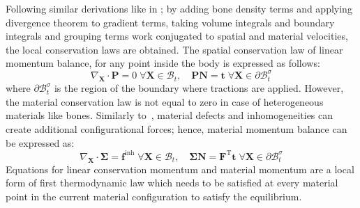 \documentclass[11pt]{acmeArticle}
\numberwithin{equation}{section}
\begin{document}
Following similar derivations like in \citep{kaczmarczyk2017energy}; by adding
bone density terms and applying divergence theorem to gradient terms, taking
volume integrals and boundary integrals and grouping terms work conjugated
to spatial and material velocities, the local conservation laws are obtained. The
spatial conservation law of linear momentum balance, for any point inside the
body is expressed as follows:
\begin{equation} \label{eq:linear_momentum}
\nabla_{\mathbf X} \cdot \mathbf P = 0
\;
\forall \mathbf{X}\in\mathcal B_t,
\quad
\mathbf{P}\mathbf{N} = \mathbf{t}\;
\forall \mathbf{X}\in\partial\mathcal B_t^\sigma
\end{equation}
where $\partial\mathcal B_t^\sigma$ is the region of the boundary where tractions are applied. 
However, the material conservation
law is not equal to zero in case of heterogeneous materials like bones.
Similarly to~\citep{kienzler2014configurational}, material defects and
inhomogeneities can create additional configurational forces; hence, material
momentum balance can be expressed as:
\begin{equation}
\nabla_{\mathbf X } \cdot {\bm {\Sigma}}= \mathbf f^{\mathrm {inh}}
\;
\forall \mathbf{X}\in\mathcal B_t,
\quad
{\bm {\Sigma}}\mathbf{N} = \mathbf{F}^\textrm{T}\mathbf{t}\;
\forall \mathbf{X}\in\partial\mathcal B_t^\sigma
\end{equation}
Equations for linear conservation momentum and material momentum are a local
form of first thermodynamic law which needs to be satisfied at every material
point in the current material configuration to satisfy the equilibrium.
\end{document}
